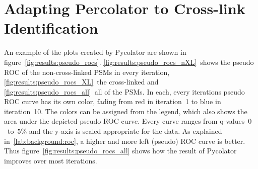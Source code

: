 \section{Adapting Percolator to Cross-link Identification}
\label{lab:results:pseudo_rocs}
An example of the plots created by Pycolator are shown in figure~\ref{fig:results:pseudo_rocs}. \ref{fig:results:pseudo_rocs_nXL}~shows the pseudo ROC of the non-cross-linked PSMs in every iteration, \ref{fig:results:pseudo_rocs_XL}~the cross-linked and \ref{fig:results:pseudo_rocs_all}~all of the PSMs. In each, every iterations pseudo ROC curve has its own color, fading from red in iteration~1 to blue in iteration~10. The colors can be assigned from the legend, which also shows the area under the depicted pseudo ROC curve. Every curve ranges from q-values~$0$~to~$5\%$ and the y-axis is scaled appropriate for the data. As explained in~\ref{lab:background:roc}, a higher and more left (pseudo) ROC curve is better. Thus figure~\ref{fig:results:pseudo_rocs_all} shows how the result of Pycolator improves over most iterations.\\
\renewcommand{\baselinestretch}{0.9}

